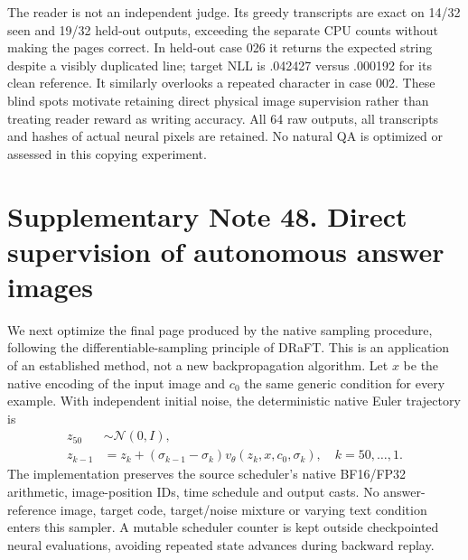 \documentclass[10pt,a4paper]{article}
\begin{document}
The reader is not an independent judge. Its greedy transcripts are exact
on 14/32 seen and 19/32 held-out outputs, exceeding the separate CPU counts
without making the pages correct. In held-out case 026 it returns the
expected string despite a visibly duplicated line; target NLL is .042427
versus .000192 for its clean reference. It similarly overlooks a repeated
character in case 002. These blind spots motivate retaining direct physical
image supervision rather than treating reader reward as writing accuracy.
All 64 raw outputs, all transcripts and hashes of actual neural pixels are
retained. No natural QA is optimized or assessed in this copying experiment.

\clearpage
{}

\clearpage
\section*{Supplementary Note 48. Direct supervision of autonomous answer images}

We next optimize the final page produced by the native sampling procedure,
following the differentiable-sampling principle of DRaFT\cite{draft}.
This is an application of an established method, not a new backpropagation
algorithm. Let $x$ be the native encoding of the input image and $c_0$ the
same generic condition for every example. With independent initial noise,
the deterministic native Euler trajectory is
\begin{align}
 z_{50}&\sim\mathcal N(0,I),\\
 z_{k-1}&=z_k+(\sigma_{k-1}-\sigma_k)
             v_\theta(z_k,x,c_0,\sigma_k),\quad k=50,\ldots,1.
\end{align}
The implementation preserves the source scheduler's native BF16/FP32
arithmetic, image-position IDs, time schedule and output casts. No answer-reference
image, target code, target/noise mixture or varying text condition enters
this sampler. A mutable scheduler counter is kept outside checkpointed
neural evaluations, avoiding repeated state advances during backward replay.
\end{document}

